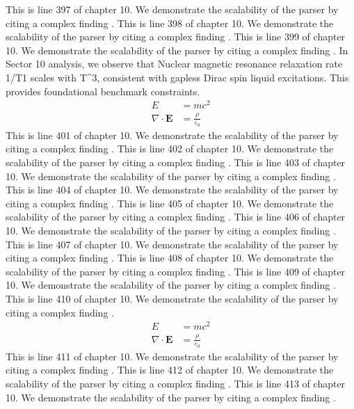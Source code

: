 This is line 397 of chapter 10. We demonstrate the scalability of the parser by citing a complex finding \cite{ref10_397}.
This is line 398 of chapter 10. We demonstrate the scalability of the parser by citing a complex finding \cite{ref10_398}.
This is line 399 of chapter 10. We demonstrate the scalability of the parser by citing a complex finding \cite{ref10_399}.
In Sector 10 analysis, we observe that Nuclear magnetic resonance relaxation rate 1/T1 scales with T^3, consistent with gapless Dirac spin liquid excitations. This provides foundational benchmark constraints.
\begin{align*}
  E &= mc^2 \\
  \nabla \cdot \mathbf{E} &= \frac{\rho}{\varepsilon_0}
\end{align*}
This is line 401 of chapter 10. We demonstrate the scalability of the parser by citing a complex finding \cite{ref10_401}.
This is line 402 of chapter 10. We demonstrate the scalability of the parser by citing a complex finding \cite{ref10_402}.
This is line 403 of chapter 10. We demonstrate the scalability of the parser by citing a complex finding \cite{ref10_403}.
This is line 404 of chapter 10. We demonstrate the scalability of the parser by citing a complex finding \cite{ref10_404}.
This is line 405 of chapter 10. We demonstrate the scalability of the parser by citing a complex finding \cite{ref10_405}.
This is line 406 of chapter 10. We demonstrate the scalability of the parser by citing a complex finding \cite{ref10_406}.
This is line 407 of chapter 10. We demonstrate the scalability of the parser by citing a complex finding \cite{ref10_407}.
This is line 408 of chapter 10. We demonstrate the scalability of the parser by citing a complex finding \cite{ref10_408}.
This is line 409 of chapter 10. We demonstrate the scalability of the parser by citing a complex finding \cite{ref10_409}.
This is line 410 of chapter 10. We demonstrate the scalability of the parser by citing a complex finding \cite{ref10_410}.
\begin{align*}
  E &= mc^2 \\
  \nabla \cdot \mathbf{E} &= \frac{\rho}{\varepsilon_0}
\end{align*}
This is line 411 of chapter 10. We demonstrate the scalability of the parser by citing a complex finding \cite{ref10_411}.
This is line 412 of chapter 10. We demonstrate the scalability of the parser by citing a complex finding \cite{ref10_412}.
This is line 413 of chapter 10. We demonstrate the scalability of the parser by citing a complex finding \cite{ref10_413}.
